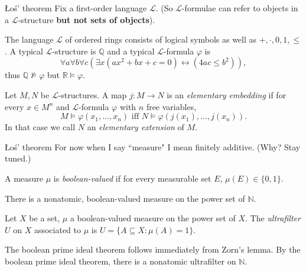 \documentclass[10pt]{beamer}
\newcommand{\NN}{\mathbb{N}}
\newcommand{\QQ}{\mathbb{Q}}
\newcommand{\RR}{\mathbb{R}}
\begin{document}
\begin{frame}{Łoś' theorem}
    Fix a first-order language $\mathcal L$. (So $\mathcal L$-formulae can refer to objects in a $\mathcal L$-structure \textbf{but not sets of objects}).

\pause

\begin{example}
    The language $\mathcal L$ of ordered rings consists of logical symbols as well as $+,\cdot,0,1,\leq$. A typical $\mathcal L$-structure is $\mathbb Q$ and a typical $\mathcal L$-formula $\varphi$ is
    $$\forall a \forall b \forall c(\exists x(ax^2 + bx + c = 0) \leftrightarrow (4ac \leq b^2)),$$
    thus $\QQ \not \models \varphi$ but $\RR \models \varphi$.
\end{example}

\pause

\begin{definition}
    Let $M, N$ be $\mathcal L$-structures.
    A map $j: M \to N$ is an \emph{elementary embedding} if for every $x \in M^n$ and $\mathcal L$-formula $\varphi$ with $n$ free variables,
    $$M \models \varphi(x_1, \dots, x_n)\text{ iff } N \models \varphi(j(x_1), \dots, j(x_n)).$$
    In that case we call $N$ an \emph{elementary extension} of $M$.
\end{definition}
\end{frame}

\begin{frame}{Łoś' theorem}
    For now when I say ``measure" I mean finitely additive. (Why? Stay tuned.)

\begin{definition}
    A measure $\mu$ is \emph{boolean-valued} if for every measurable set $E$, $\mu(E) \in \{0, 1\}$.
\end{definition}

\pause

\begin{theorem}
    There is a nonatomic, boolean-valued measure on the power set of $\NN$.
\end{theorem}

\pause

\begin{definition}
    Let $X$ be a set, $\mu$ a boolean-valued measure on the power set of $X$. The \emph{ultrafilter} $U$ on $X$ associated to $\mu$ is $U = \{A \subseteq X: \mu(A) = 1\}$.
\end{definition}

\pause

  The boolean prime ideal theorem follows immediately from Zorn's lemma. By the boolean prime ideal theorem, there is a nonatomic ultrafilter on $\NN$.
\end{frame}
\end{document}

